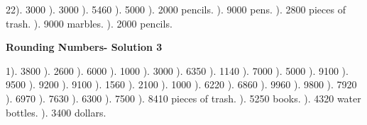\documentclass{article}%
\begin{document}
22). 3000%
). 3000%
). 5460%
). 5000%
). 2000 pencils.%
). 9000 pens.%
). 2800 pieces of trash.%
). 9000 marbles.%
). 2000 pencils.%
\newline%
\newpage%
\large%
\begin{center}%
\textbf{Rounding Numbers- Solution 3}%
\newline%
\end{center} \normalsize%
1). 3800%
). 2600%
). 6000%
). 1000%
). 3000%
). 6350%
). 1140%
). 7000%
). 5000%
). 9100%
). 9500%
). 9200%
). 9100%
). 1560%
). 2100%
). 1000%
). 6220%
). 6860%
). 9960%
). 9800%
). 7920%
). 6970%
). 7630%
). 6300%
). 7500%
). 8410 pieces of trash.%
). 5250 books.%
). 4320 water bottles.%
). 3400 dollars.%
\newline%
\end{document}
